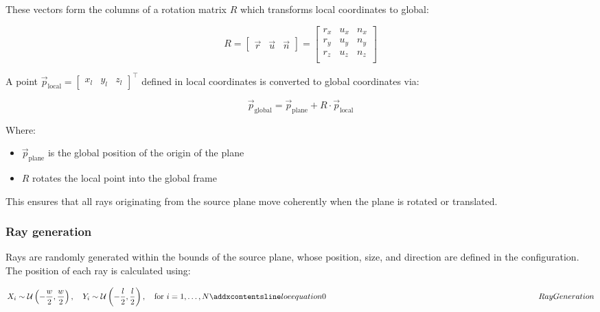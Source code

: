 These vectors form the columns of a rotation matrix $R$ which transforms local coordinates to global:

\begin{equation}
R = 
\begin{bmatrix}
\vec{r} & \vec{u} & \vec{n}
\end{bmatrix}
=
\begin{bmatrix}
r_x & u_x & n_x \\
r_y & u_y & n_y \\
r_z & u_z & n_z \\
\end{bmatrix}
\label{eq:rotation_matrix}
\end{equation}

A point $\vec{p}_\text{local} = \begin{bmatrix} x_l & y_l & z_l \end{bmatrix}^\top$ defined in local coordinates is converted to global coordinates via:

\begin{equation}
\vec{p}_\text{global} = \vec{p}_\text{plane} + R \cdot \vec{p}_\text{local}
\label{eq:local_to_global}
\end{equation}

Where:
\begin{itemize}
    \item $\vec{p}_\text{plane}$ is the global position of the origin of the plane
    \item $R$ rotates the local point into the global frame
\end{itemize}

This ensures that all rays originating from the source plane move coherently when the plane is rotated or translated.

\subsubsection{Ray generation}
Rays are randomly generated within the bounds of the source plane, whose position, size, and direction are defined in the configuration. The position of each ray is calculated using:

\begin{equation}
X_i \sim \mathcal{U}\left(-\frac{w}{2}, \frac{w}{2}\right), \quad
Y_i \sim \mathcal{U}\left(-\frac{l}{2}, \frac{l}{2}\right), \quad
\text{for } i = 1, \ldots, N
\label{eq:RayGeneration}
\addequation{Ray Generation}
\end{equation}

